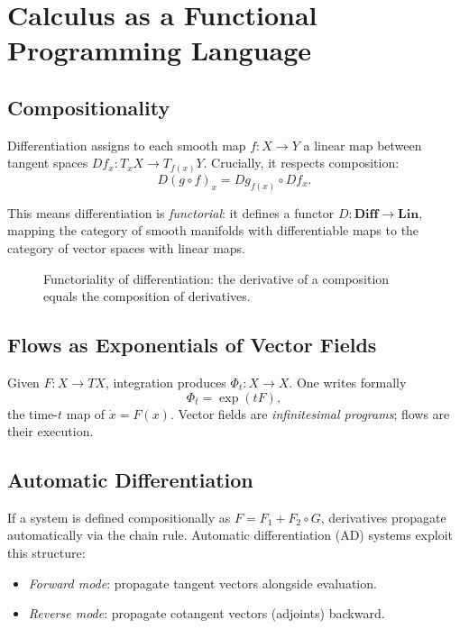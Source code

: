 \documentclass[12pt,openany]{book}
\begin{document}
\chapter{Calculus as a Functional Programming Language}
\label{ch:fp}

\section{Compositionality}

Differentiation assigns to each smooth map $f:X\to Y$ a linear map between
tangent spaces $Df_x:T_xX\to T_{f(x)}Y$. Crucially, it respects composition:
\[
  D(g\circ f)_x = Dg_{f(x)}\circ Df_x.
\]

This means differentiation is \emph{functorial}: it defines a functor
$D:\mathbf{Diff}\to\mathbf{Lin}$, mapping the category of smooth manifolds
with differentiable maps to the category of vector spaces with linear maps.

\begin{figure}[H]
\centering
{}
\caption{Functoriality of differentiation: the derivative of a composition
equals the composition of derivatives.}
\label{fig:functor}
\end{figure}

\section{Flows as Exponentials of Vector Fields}

Given $F:X\to TX$, integration produces $\Phi_t:X\to X$. One writes formally
\[
  \Phi_t = \exp(tF),
\]
the time-$t$ map of $\dot x = F(x)$. Vector fields are \emph{infinitesimal
programs}; flows are their execution.

\section{Automatic Differentiation}

If a system is defined compositionally as $F=F_1+F_2\circ G$, derivatives
propagate automatically via the chain rule. Automatic differentiation (AD)
systems exploit this structure:
\begin{itemize}[leftmargin=1.5em]
  \item \emph{Forward mode}: propagate tangent vectors alongside evaluation.
  \item \emph{Reverse mode}: propagate cotangent vectors (adjoints) backward.
\end{itemize}
\end{document}
